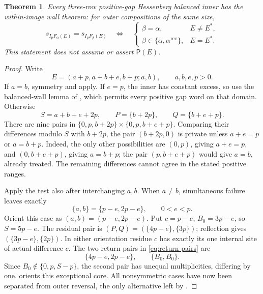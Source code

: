 \documentclass[11pt,a4paper]{amsart}
\numberwithin{equation}{section}
\theoremstyle{plain}
\newtheorem{theorem}{Theorem}[section]
\theoremstyle{definition}
\begin{document}
\begin{theorem}\label{thm:three-row-wall}
Every three-row positive-gap Hessenberg balanced inner has the within-image wall theorem: for outer compositions of the same size,
\[
 s_{I_pF_\alpha(E)}=s_{I_pF_\beta(E)}
 \quad\Longleftrightarrow\quad
 \begin{cases}
 \beta=\alpha,&E\ne E^*,\\
 \beta\in\{\alpha,\alpha^{\mathrm{rev}}\},&E=E^*.
 \end{cases}
\]
This statement does not assume or assert \(\mathsf P(E)\).
\end{theorem}
\begin{proof}
Write
\[
 E=(a+p,a+b+e,b+p;a,b),\qquad a,b,e,p>0.
\]
If \(a=b\), symmetry and  apply.  If \(e=p\), the inner has constant excess, so use the balanced-wall lemma of \cite{Shields2026PowerRigidity}, which permits every positive gap word on that domain.  Otherwise
\[
 S=a+b+e+2p,\qquad P=\{b+2p\},\qquad Q=\{b+e+p\}.
\]
There are nine pairs in \(\{0,p,b+2p\}\times\{0,p,b+e+p\}\).  Comparing their differences modulo \(S\) with \(b+2p\), the pair \((b+2p,0)\) is private unless \(a+e=p\) or \(a=b+p\).  Indeed, the only other possibilities are \((0,p)\), giving \(a+e=p\), and \((0,b+e+p)\), giving \(a=b+p\); the pair \((p,b+e+p)\) would give \(a=b\), already treated.  The remaining differences cannot agree in the stated positive ranges.

Apply the test also after interchanging \(a,b\).  When \(a\ne b\), simultaneous failure leaves exactly
\[
 \{a,b\}=\{p-e,2p-e\},\qquad 0<e<p.
\]
Orient this case as \((a,b)=(p-e,2p-e)\).  Put \(c=p-e\), \(B_0=3p-e\), so \(S=5p-e\).  The residual pair is \((P,Q)=(\{4p-e\},\{3p\})\); reflection gives \((\{3p-e\},\{2p\})\).  In either orientation residue \(c\) has exactly its one internal site of actual difference \(c\).  The two return pairs in \eqref{eq:return-pairs} are
\[
 \{4p-e,2p-e\},\qquad \{B_0,B_0\}.
\]
Since \(B_0\notin\{0,p,S-p\}\), the second pair has unequal multiplicities, differing by one.   orients this exceptional core.  All nonsymmetric cases have now been separated from outer reversal, the only alternative left by .
\end{proof}
\end{document}
